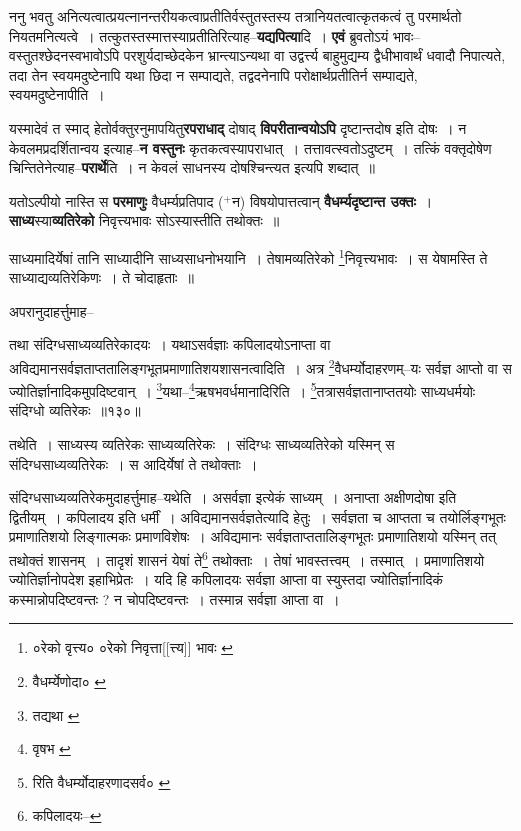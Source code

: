 \documentclass[article,12pt,a4paper]{memoir}
\newcommand{\add}[1]{($^{+}$#1)}
\begin{document}
	  \pstart ननु भवतु अनित्यत्वात्प्रयत्नानन्तरीयकत्वाप्रतीतिर्वस्तुतस्तस्य तत्रानियतत्वात्कृतकत्वं तु परमार्थतो नियतमनित्यत्वे । तत्कुतस्तस्मात्तस्याप्रतीतिरित्याह--\textbf{यद्यपित्या}दि । \textbf{एवं} ब्रुवतोऽयं भावः--वस्तुतश्छेदनस्वभावोऽपि परशुर्यदाच्छेदकेन भ्रान्त्याऽन्यथा वा उद्वर्त्त्य बाहुमुद्यम्य द्वैधीभावार्थं धवादौ निपात्यते, तदा तेन स्वयमदुष्टेनापि यथा छिदा न सम्पाद्यते, तद्वदनेनापि परोक्षार्थप्रतीतिर्न सम्पाद्यते, स्वयमदुष्टेनापीति ।
	\pend
      

	  \pstart यस्मादेवं त \leavevmode{} स्माद् हेतोर्वक्तुरनुमापयितु\textbf{रपराधाद्} दोषाद् \textbf{विपरीतान्वयोऽपि} दृष्टान्तदोष इति दोषः । न केवलमप्रदर्शितान्वय इत्याह--\textbf{न वस्तुनः} कृतकत्वस्यापराधात् । तत्तावत्स्वतोऽदुष्टम् । तत्किं वक्तृदोषेण चिन्तितेनेत्याह--\textbf{परार्थे}ति । न केवलं साधनस्य दोषश्चिन्त्यत इत्यपि शब्दात् ॥
	\pend
      

	  \pstart यतोऽल्पीयो नास्ति स \textbf{परमाणुः} वैधर्म्यप्रतिपाद \add{न} विषयोपात्तत्वान् \textbf{वैधर्म्यदृष्टान्त उक्तः} । \textbf{साध्य}स्या\textbf{व्यतिरेको} निवृत्त्यभावः सोऽस्यास्तीति तथोक्तः ॥
	\pend
	  \bigskip
	  \begingroup
	

	  \pstart साध्यमादिर्येषां तानि साध्यादीनि साध्यसाधनोभयानि । तेषामव्यतिरेको \footnote{०रेको वृत्त्य० \cite{dp-msA} \cite{dp-edP} \cite{dp-edH} \cite{dp-edN} ०रेको निवृत्ता[[त्त्य]] भावः \cite{dp-msB}}\-निवृत्त्यभावः । स येषामस्ति ते साध्याद्यव्यतिरेकिणः । ते चोदाहृताः ॥
	\pend
       

	  \pstart अपरानुदाहर्त्तुमाह--
	\pend
       
	  \bigskip
	  \begingroup
	

	  \pstart तथा संदिग्धसाध्यव्यतिरेकादयः । यथाऽसर्वज्ञाः कपिलादयोऽनाप्ता वा अविद्यमानसर्वज्ञताप्ततालिङ्गभूतप्रमाणातिशयशासनत्वादिति । अत्र \footnote{वैधर्म्येणोदा० \cite{dp-msC}}\-वैधर्म्योदाहरणम्--यः सर्वज्ञ आप्तो वा स ज्योतिर्ज्ञानादिकमुपदिष्टवान् । \footnote{तद्यथा \cite{dp-msB} \cite{dp-msD} \cite{dp-edP} \cite{dp-edH} \cite{dp-edE} \cite{dp-edN}}\-यथा--\footnote{वृषभ \cite{dp-msC}}\-ऋषभवर्धमानादिरिति । \footnote{रिति वैधर्म्योदाहरणादसर्व० \cite{dp-msC}}\-तत्रासर्वज्ञतानाप्ततयोः साध्यधर्मयोः संदिग्धो व्यतिरेकः ॥१३०॥
	\pend
      
	  \endgroup
	 

	  \pstart तथेति । साध्यस्य व्यतिरेकः साध्यव्यतिरेकः । संदिग्धः साध्यव्यतिरेको यस्मिन् स संदिग्धसाध्यव्यतिरेकः । स आदिर्येषां ते तथोक्ताः ।
	\pend
       

	  \pstart संदिग्धसाध्यव्यतिरेकमुदाहर्त्तुमाह--यथेति । असर्वज्ञा इत्येकं साध्यम् । अनाप्ता अक्षीणदोषा इति द्वितीयम् । कपिलादय इति धर्मीं । अविद्यमानसर्वज्ञतेत्यादि हेतुः । सर्वज्ञता च आप्तता च तयोर्लिङ्गभूतः प्रमाणातिशयो लिङ्गात्मकः प्रमाणविशेषः । अविद्यमानः सर्वज्ञताप्ततालिङ्गभूतः प्रमाणातिशयो यस्मिन् तत् तथोक्तं शासनम् । तादृशं शासनं येषां ते\footnote{कपिलादयः--\cite{dp-msD-n}} तथोक्ताः । तेषां भावस्तत्त्वम् । तस्मात् । प्रमाणातिशयो ज्योतिर्ज्ञानोपदेश इहाभिप्रेतः । यदि हि कपिलादयः सर्वज्ञा आप्ता वा स्युस्तदा ज्योतिर्ज्ञानादिकं कस्मान्नोपदिष्टवन्तः ? न चोपदिष्टवन्तः । तस्मान्न सर्वज्ञा आप्ता वा ।
	\pend
       
\end{document}
